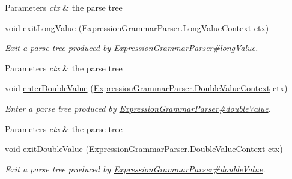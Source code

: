 \begin{DoxyCompactItemize}
\begin{DoxyCompactList}
\begin{DoxyParams}{Parameters}
{\em ctx} & the parse tree\\
\hline
\end{DoxyParams}
 \end{DoxyCompactList}\item 
void \hyperlink{classgov_1_1nasa_1_1jpf_1_1inspector_1_1server_1_1expression_1_1parser_1_1_expression_grammar_base_listener_ab2de689a4457a9f9e1af84014bf3e30f}{exit\+Long\+Value} (\hyperlink{classgov_1_1nasa_1_1jpf_1_1inspector_1_1server_1_1expression_1_1parser_1_1_expression_grammar_parser_1_1_long_value_context}{Expression\+Grammar\+Parser.\+Long\+Value\+Context} ctx)
\begin{DoxyCompactList}\small\item\em Exit a parse tree produced by \hyperlink{classgov_1_1nasa_1_1jpf_1_1inspector_1_1server_1_1expression_1_1parser_1_1_expression_grammar_parser_a304943f298174b8ace1f54cbff8ed321}{Expression\+Grammar\+Parser\#long\+Value}.


\begin{DoxyParams}{Parameters}
{\em ctx} & the parse tree\\
\hline
\end{DoxyParams}
 \end{DoxyCompactList}\item 
void \hyperlink{classgov_1_1nasa_1_1jpf_1_1inspector_1_1server_1_1expression_1_1parser_1_1_expression_grammar_base_listener_abfb429f22151e21f01aa2fa29fdc77f0}{enter\+Double\+Value} (\hyperlink{classgov_1_1nasa_1_1jpf_1_1inspector_1_1server_1_1expression_1_1parser_1_1_expression_grammar_parser_1_1_double_value_context}{Expression\+Grammar\+Parser.\+Double\+Value\+Context} ctx)
\begin{DoxyCompactList}\small\item\em Enter a parse tree produced by \hyperlink{classgov_1_1nasa_1_1jpf_1_1inspector_1_1server_1_1expression_1_1parser_1_1_expression_grammar_parser_a973f6782c3c1a0c542c9456bf14b33ae}{Expression\+Grammar\+Parser\#double\+Value}.


\begin{DoxyParams}{Parameters}
{\em ctx} & the parse tree\\
\hline
\end{DoxyParams}
 \end{DoxyCompactList}\item 
void \hyperlink{classgov_1_1nasa_1_1jpf_1_1inspector_1_1server_1_1expression_1_1parser_1_1_expression_grammar_base_listener_a0d58962fca0e7e83b2cd74b059a76943}{exit\+Double\+Value} (\hyperlink{classgov_1_1nasa_1_1jpf_1_1inspector_1_1server_1_1expression_1_1parser_1_1_expression_grammar_parser_1_1_double_value_context}{Expression\+Grammar\+Parser.\+Double\+Value\+Context} ctx)
\begin{DoxyCompactList}\small\item\em Exit a parse tree produced by \hyperlink{classgov_1_1nasa_1_1jpf_1_1inspector_1_1server_1_1expression_1_1parser_1_1_expression_grammar_parser_a973f6782c3c1a0c542c9456bf14b33ae}{Expression\+Grammar\+Parser\#double\+Value}.



\end{DoxyCompactList}
\end{DoxyCompactItemize}
